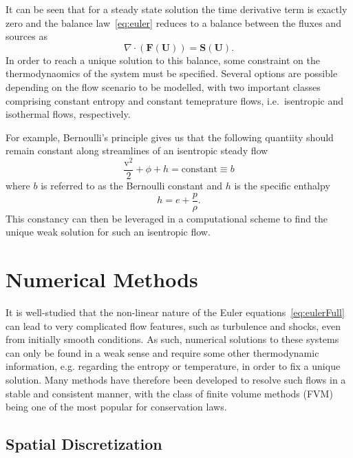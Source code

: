 It can be seen that for a steady state solution the time derivative term is exactly zero and the balance law~\eqref{eq:euler} reduces to a balance between the fluxes and sources as
\begin{equation}
\nabla\cdot(\mathbf{F}(\mathbf{U}))=\mathbf{S}(\mathbf{U}).
\end{equation}
In order to reach a unique solution to this balance, some constraint on the thermodynaomics of the system must be specified. Several options are possible depending on the flow scenario to be modelled, with two important classes comprising constant entropy and constant temeprature flows, i.e.~isentropic and isothermal flows, respectively.

For example, Bernoulli's principle gives us that the following quantiity should remain constant along streamlines of an isentropic steady flow
\begin{equation}
\frac{\mathrm{v}^2}{2}+\phi+h=\textrm{constant}\equiv b
\end{equation}
where $b$ is referred to as the Bernoulli constant and $h$ is the specific enthalpy
\begin{equation}
h=e+\frac{p}{\rho}.
\end{equation}
This constancy can then be leveraged in a computational scheme to find the unique weak solution for such an isentropic flow.


\section{Numerical Methods}
\label{sec:numerics}

It is well-studied that the non-linear nature of the Euler equations~\eqref{eq:eulerFull} can lead to very complicated flow features, such as turbulence and shocks, even from initially smooth conditions. As such, numerical solutions to these systems can only be found in a weak sense and require some other thermodynamic information, e.g. regarding the entropy or temperature, in order to fix a unique solution. Many methods have therefore been developed to resolve such flows in a stable and consistent manner, with the class of finite volume methods (FVM) being one of the most popular for conservation laws.

\subsection{Spatial Discretization}
\label{subsec:space}

